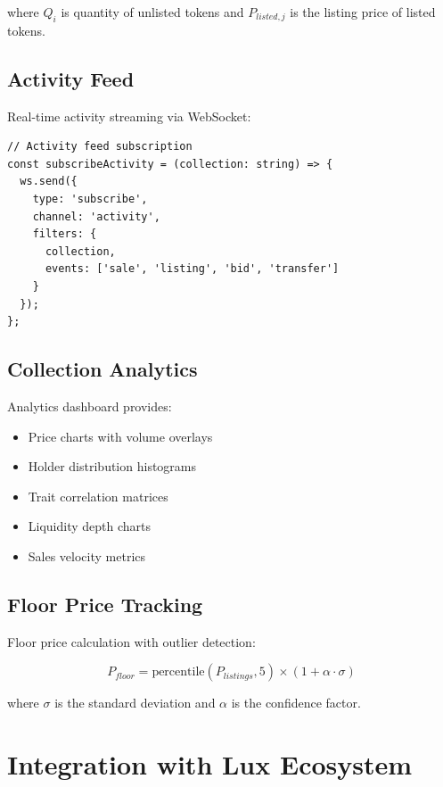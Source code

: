 \documentclass[11pt,a4paper]{article}
\begin{document}
where $Q_i$ is quantity of unlisted tokens and $P_{listed,j}$ is the listing price of listed tokens.

\subsection{Activity Feed}

Real-time activity streaming via WebSocket:

\begin{lstlisting}[language=Solidity]
// Activity feed subscription
const subscribeActivity = (collection: string) => {
  ws.send({
    type: 'subscribe',
    channel: 'activity',
    filters: {
      collection,
      events: ['sale', 'listing', 'bid', 'transfer']
    }
  });
};
\end{lstlisting}

\subsection{Collection Analytics}

Analytics dashboard provides:

\begin{itemize}
\item Price charts with volume overlays
\item Holder distribution histograms
\item Trait correlation matrices
\item Liquidity depth charts
\item Sales velocity metrics
\end{itemize}

\subsection{Floor Price Tracking}

Floor price calculation with outlier detection:

\begin{equation}
P_{floor} = \text{percentile}(P_{listings}, 5) \times (1 + \alpha \cdot \sigma)
\end{equation}

where $\sigma$ is the standard deviation and $\alpha$ is the confidence factor.

\section{Integration with Lux Ecosystem}
\end{document}
